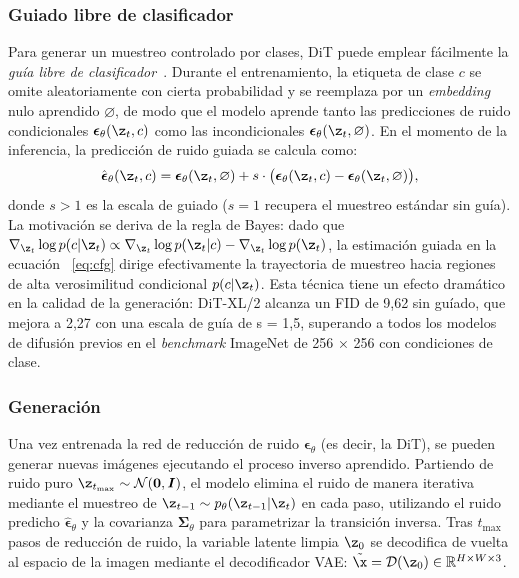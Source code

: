 \documentclass[../../book-main_es.tex]{subfiles}
\begin{document}
\subsubsection{Guiado libre de clasificador}
Para generar un muestreo controlado por clases, DiT puede emplear fácilmente la \emph{guía 
libre de clasificador}~\citep{ho2022classifier}. Durante el entrenamiento, la etiqueta de clase $c$ se 
omite aleatoriamente con cierta probabilidad y se reemplaza por un \textit{embedding} nulo aprendido 
$\varnothing$, de modo que el modelo aprende tanto las predicciones de ruido condicionales 
$\boldsymbol{\epsilon}_\theta(\z_t, c)$ como las incondicionales 
$\boldsymbol{\epsilon}_\theta(\z_t, \varnothing)$. En el momento de la inferencia, la 
predicción de ruido guiada se calcula como:
\begin{equation}
    \hat{\boldsymbol{\epsilon}}_\theta(\z_t, c) = \boldsymbol{\epsilon}_\theta(\z_t, \varnothing) + s \cdot \big(\boldsymbol{\epsilon}_\theta(\z_t, c) - \boldsymbol{\epsilon}_\theta(\z_t, \varnothing)\big),
    \label{eq:cfg}
\end{equation}
donde $s > 1$ es la escala de guiado ($s = 1$ recupera el muestreo estándar sin guía). 
La motivación se deriva de la regla de Bayes: dado que 
$\nabla_{\z_t} \log p(c | \z_t) \propto \nabla_{\z_t} \log p(\z_t | c) - \nabla_{\z_t} \log p(\z_t)$, 
la estimación guiada en la ecuación ~\eqref{eq:cfg} dirige efectivamente la trayectoria de 
muestreo hacia regiones de alta verosimilitud condicional $p(c | \z_t)$. Esta técnica tiene 
un efecto dramático en la calidad de la generación: DiT-XL/2 alcanza un FID de 9,62 sin guíado, 
que mejora a 2,27 con una escala de guía de s = 1,5, superando a todos los modelos de difusión 
previos en el \textit{benchmark} ImageNet de 256 × 256 con condiciones de clase.

\subsubsection{Generación}
Una vez entrenada la red de reducción de ruido $\boldsymbol{\epsilon}_\theta$ (es decir, la DiT), 
se pueden generar nuevas imágenes ejecutando el proceso inverso aprendido. Partiendo de ruido 
puro $\z_{t_{\max}} \sim \mathcal{N}(\boldsymbol{0}, \boldsymbol{I})$, el modelo elimina el ruido 
de manera iterativa mediante el muestreo de $\z_{t-1} \sim p_\theta(\z_{t-1} | \z_t)$ en cada paso, 
utilizando el ruido predicho $\hat{\boldsymbol{\epsilon}}_\theta$ y la covarianza $\boldsymbol{\Sigma}_\theta$ 
para parametrizar la transición inversa. Tras $t_{\max}$ pasos de reducción de ruido, la variable 
latente limpia $\z_0$ se decodifica de vuelta al espacio de la imagen mediante el decodificador 
VAE: $\tilde{\x} = \mathcal{D}(\z_0) \in \mathbb{R}^{H \times W \times 3}$.
\end{document}
